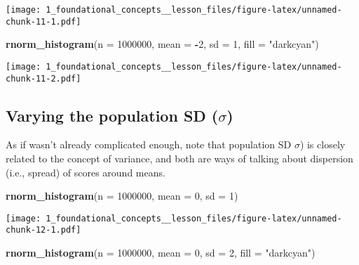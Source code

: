 \documentclass[
]{article}
\newenvironment{Shaded}{\begin{snugshade}}{\end{snugshade}}
\newcommand{\AttributeTok}[1]{\textcolor[rgb]{0.13,0.29,0.53}{#1}}
\newcommand{\DecValTok}[1]{\textcolor[rgb]{0.00,0.00,0.81}{#1}}
\newcommand{\FunctionTok}[1]{\textcolor[rgb]{0.13,0.29,0.53}{\textbf{#1}}}
\newcommand{\NormalTok}[1]{#1}
\newcommand{\SpecialCharTok}[1]{\textcolor[rgb]{0.81,0.36,0.00}{\textbf{#1}}}
\newcommand{\StringTok}[1]{\textcolor[rgb]{0.31,0.60,0.02}{#1}}
\begin{document}
\texttt{[image: 1\_foundational\_concepts\_\_lesson\_files/figure-latex/unnamed-chunk-11-1.pdf]}

\begin{Shaded}
\begin{Highlighting}[]
\FunctionTok{rnorm\_histogram}\NormalTok{(}\AttributeTok{n =} \DecValTok{1000000}\NormalTok{, }
                \AttributeTok{mean =} \SpecialCharTok{{-}}\DecValTok{2}\NormalTok{, }
                \AttributeTok{sd =} \DecValTok{1}\NormalTok{, }
                \AttributeTok{fill =} \StringTok{"darkcyan"}\NormalTok{) }
\end{Highlighting}
\end{Shaded}

\texttt{[image: 1\_foundational\_concepts\_\_lesson\_files/figure-latex/unnamed-chunk-11-2.pdf]}

\hypertarget{varying-the-population-sd-sigma}{%
\subsection{\texorpdfstring{Varying the population SD
(\(\sigma\))}{Varying the population SD (\textbackslash sigma)}}\label{varying-the-population-sd-sigma}}

As if wasn't already complicated enough, note that population SD
\(\sigma\)) is closely related to the concept of variance, and both are
ways of talking about dispersion (i.e., spread) of scores around means.

\begin{Shaded}
\begin{Highlighting}[]
\FunctionTok{rnorm\_histogram}\NormalTok{(}\AttributeTok{n =} \DecValTok{1000000}\NormalTok{, }
                \AttributeTok{mean =} \DecValTok{0}\NormalTok{, }
                \AttributeTok{sd =} \DecValTok{1}\NormalTok{) }
\end{Highlighting}
\end{Shaded}

\texttt{[image: 1\_foundational\_concepts\_\_lesson\_files/figure-latex/unnamed-chunk-12-1.pdf]}

\begin{Shaded}
\begin{Highlighting}[]
\FunctionTok{rnorm\_histogram}\NormalTok{(}\AttributeTok{n =} \DecValTok{1000000}\NormalTok{, }
                \AttributeTok{mean =} \DecValTok{0}\NormalTok{, }
                \AttributeTok{sd =} \DecValTok{2}\NormalTok{, }
                \AttributeTok{fill =} \StringTok{"darkcyan"}\NormalTok{) }
\end{Highlighting}
\end{Shaded}
\end{document}
